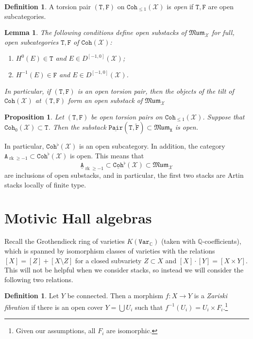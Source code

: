 \documentclass[leqno, openany]{memoir}
\newtheorem{prop}[thm]{Proposition}
\newtheorem{lem}[thm]{Lemma}
\theoremstyle{definition}
\newtheorem{defn}[thm]{Definition}
\theoremstyle{remark}
\theoremstyle{plain}
\theoremstyle{definition}
\theoremstyle{remark}
\newcommand{\C}{\mathbb{C}}
\newcommand{\Q}{\mathbb{Q}}
\newcommand{\mc}[1]{\mathcal{#1}}
\newcommand{\mf}[1]{\mathfrak{#1}}
\newcommand{\mt}[1]{\mathtt{#1}}
\newcommand{\on}[1]{\operatorname{#1}}
\newcommand{\ul}[1]{\underline{#1}}
\newcommand{\wt}[1]{\widetilde{#1}}
\begin{document}
\begin{defn}
    A torsion pair $(\mt{T}, \mt{F})$ on $\mt{Coh}_{\leq 1}(\mc{X})$ is \textit{open} if $\mt{T}, \mt{F}$ are open subcategories.
\end{defn}

\begin{lem}
    The following conditions define open substacks of $\mf{Mum}_{\mc{X}}$ for full, open subcategories $\mt{T}, \mt{F}$ of $\mt{Coh}(\mc{X})$:
    \begin{enumerate}
        \item $H^0(E) \in \mt{T}$ and $E \in D^{[-1,0]}(\mc{X})$;
        \item $H^{-1}(E) \in \mt{F}$ and $E \in D^{[-1,0]}(\mc{X})$.
    \end{enumerate}
    In particular, if $(\mt{T}, \mt{F})$ is an open torsion pair, then the objects of the tilt of $\mt{Coh}(\mc{X})$ at $(\mt{T}, \mt{F})$ form an open substack of $\mf{Mum}_{\mc{X}}$
\end{lem}

\begin{prop}
    Let $(\mt{T}, \mt{F})$ be open torsion pairs on $\mt{Coh}_{\leq 1}(\mc{X})$. Suppose that $\mt{Coh}_0(\mc{X}) \subset \mt{T}$. Then the substack $\mt{\ul{Pair}(T, \wt{F})} \subset \mf{Mum}_{\mt{X}}$ is open.
\end{prop}

In particular, $\mt{Coh}^{\flat}(\mc{X})$ is an open subcategory. In addition, the category $\mt{A}_{\on{rk}\geq -1} \subset \mt{Coh}^{\flat}(\mc{X})$ is open. This means that
\[ \mt{\ul{A}}_{\on{rk} \geq -1} \subset \ul{\mt{Coh}}^{\flat}(\mc{X}) \subset \mf{Mum}_{\mc{X}} \]
are inclusions of open substacks, and in particular, the first two stacks are Artin stacks locally of finite type.

\section{Motivic Hall algebras}

Recall the Grothendieck ring of varieties $K(\mt{Var}_{\C})$ (taken with $\Q$-coefficients), which is spanned by isomorphism classes of varieties with the relations $[X] = [Z] + [X \setminus Z]$ for a closed subvariety $Z \subset X$ and $[X] \cdot [Y] = [X \times Y]$. This will not be helpful when we consider stacks, so instead we will consider the following two relations.

\begin{defn}
    Let $Y$ be connected. Then a morphism $f \colon X \to Y$ is a \textit{Zariski fibration} if there is an open cover $Y = \bigcup U_i$ such that $f^{-1}(U_i) = U_i \times F_i$.\footnote{Given our assumptions, all $F_i$ are isomorphic.}
\end{defn}
\end{document}
